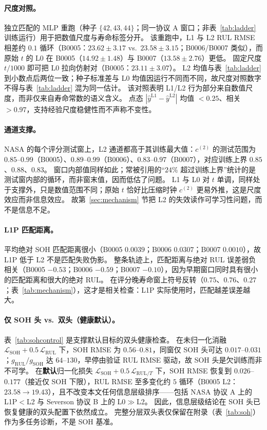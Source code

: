 \documentclass[UTF8,a4paper,12pt]{ctexart}
\begin{document}
\paragraph{尺度对照。}
独立匹配的 MLP 重跑（种子 $\{42,43,44\}$；同一协议 A 窗口；非表~\ref{tab:ladder} 训练运行）用于把数值尺度与寿命标签分开。
该重跑中，L1 与 L2 RUL RMSE 相差约 $0.1$ 循环（B0005：$23.62\pm3.17$ vs.\ $23.58\pm3.15$；B0006/B0007 类似），而原始 $t$ 的 L0 在 B0005（$14.92\pm1.48$）与 B0007（$13.58\pm2.76$）更低。
固定尺度 $t/1000$ 即可把 L0 拉向仿射对（B0005：$23.11\pm3.07$）。
L2 均值与表~\ref{tab:ladder} 到小数点后两位一致；种子标准差与 L0 均值因运行不同而不同，故尺度对照数字不得与表~\ref{tab:ladder} 混为同一估计。
该对照表明 L1/L2 行为部分来自数值尺度，而非仅来自寿命常数的语义含义。
点态 $|\hat y^{\mathrm{L1}}-\hat y^{\mathrm{L2}}|$ 均值 $<0.25$、相关 $>0.97$，支持经验尺度稳健性而不声称不变性。

\paragraph{通道支撑。}
NASA 的每个评分测试窗上，L2 通道都高于其训练最大值：$c^{(2)}$ 的测试范围为 $0.85$--$0.99$（B0005）、$0.89$--$0.99$（B0006）、$0.83$--$0.97$（B0007），对应训练上界 $0.85$、$0.88$、$0.83$。
窗口内部值同样如此；常被引用的“$24\%$ 超过训练上界”统计的是测试窗内部的循环，而非窗末值，因而低估了问题。
L1 与 L0 对 $t$ 单调，同样处于支撑外，只是数值范围不同；原始 $t$ 恰好比压缩时钟 $c^{(2)}$ 更易外推，这是尺度效应而非信息效应。
故第~\ref{sec:mechanism} 节把 L2 的失效读作可学习性问题，而不是信息不足。

\paragraph{L1P 匹配距离。}
平均绝对 SOH 匹配距离很小（B0005 $0.0039$；B0006 $0.0307$；B0007 $0.0010$），故 L1P 低于 L2 不是匹配失败伪影。
整条轨迹上，匹配距离与绝对 RUL 误差弱负相关（B0005 $-0.53$；B0006 $-0.59$；B0007 $-0.10$），因为早期窗口同时具有很小的匹配距离和很大的绝对 RUL。
在评分晚寿命窗上符号反转（$0.75$、$0.76$、$0.27$；表~\ref{tab:mechanism}），这才是相关检查：L1P 实际使用时，匹配越差误差越大。

\paragraph{仅 SOH 头 vs.\ 双头（健康默认）。}
表~\ref{tab:sohcontrol} 是支撑默认目标的双头健康检查。
在未归一化消融 $\mathcal{L}_{\mathrm{SOH}}+0.5\,\mathcal{L}_{\mathrm{RUL}}$ 下，SOH RMSE 为 $0.56$--$0.81$，同窗仅 SOH 头可达 $0.017$--$0.031$；$g_{\mathrm{RUL}}/g_{\mathrm{SOH}}$ 达 $64$--$130$，早停由验证 RUL RMSE 驱动，故 SOH 头是欠训练而非不可学。
在\textbf{默认}归一化损失 $\mathcal{L}_{\mathrm{SOH}}+0.5\,\mathcal{L}_{\mathrm{RUL}/T}$ 下，SOH RMSE 恢复到 $0.026$--$0.177$（接近仅 SOH 下限），RUL RMSE 至多变化约 $5$ 循环（B0005 L2：$23.58\to 19.43$），且不改变本文任何信息层级排序——包括 NASA 协议 A 上的 L1P$<$L2 与 Severson 协议 B 上的 L0$\gg$L2。
因此，信息层级结论在 SOH 头已恢复健康的双头配置下依然成立。
完整分层双头表仅保留在附录（表~\ref{tab:soh}）作为多任务诊断，不是 SOH 基准。
\end{document}
